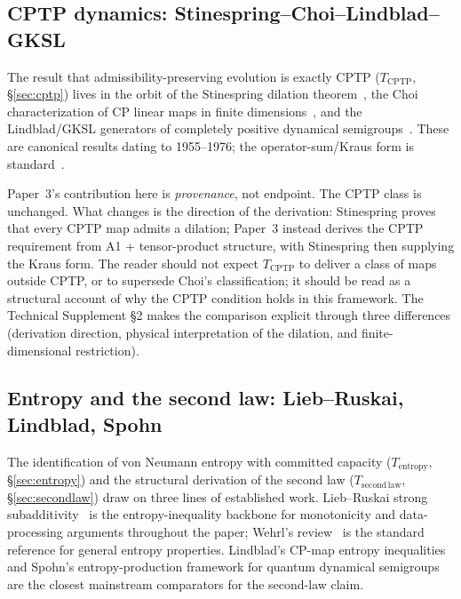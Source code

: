 \documentclass[11pt]{article}
\begin{document}
\subsection{CPTP dynamics: Stinespring--Choi--Lindblad--GKSL}

The result that admissibility-preserving evolution is exactly CPTP
($T_{\mathrm{CPTP}}$, \S\ref{sec:cptp}) lives in the orbit of the
Stinespring dilation theorem~\cite{Stinespring1955}, the Choi
characterization of CP linear maps in finite
dimensions~\cite{Choi1975}, and the Lindblad/GKSL generators of completely
positive dynamical semigroups~\cite{Lindblad1976,GKS1976}.  These are
canonical results dating to 1955--1976; the operator-sum/Kraus form is
standard~\cite{Kraus1983}.

Paper~3's contribution here is \emph{provenance}, not endpoint.  The CPTP
class is unchanged.  What changes is the direction of the derivation:
Stinespring proves that every CPTP map admits a dilation; Paper~3 instead
derives the CPTP requirement from A1 + tensor-product structure, with
Stinespring then supplying the Kraus form.  The reader should not expect
$T_{\mathrm{CPTP}}$ to deliver a class of maps outside CPTP, or to supersede
Choi's classification; it should be read as a structural account of why the
CPTP condition holds in this framework.  The Technical Supplement \S 2 makes
the comparison explicit through three differences (derivation direction,
physical interpretation of the dilation, and finite-dimensional restriction).

\subsection{Entropy and the second law: Lieb--Ruskai, Lindblad, Spohn}

The identification of von Neumann entropy with committed capacity
($T_{\mathrm{entropy}}$, \S\ref{sec:entropy}) and the structural derivation
of the second law ($T_{\mathrm{second\,law}}$, \S\ref{sec:secondlaw}) draw
on three lines of established work.  Lieb--Ruskai strong
subadditivity~\cite{LiebRuskai1973} is the entropy-inequality backbone for
monotonicity and data-processing arguments throughout the paper; Wehrl's
review~\cite{Wehrl1978} is the standard reference for general entropy
properties.  Lindblad's CP-map entropy inequalities~\cite{Lindblad1976} and
Spohn's entropy-production framework for quantum dynamical
semigroups~\cite{Spohn1978} are the closest mainstream comparators for the
second-law claim.
\end{document}
